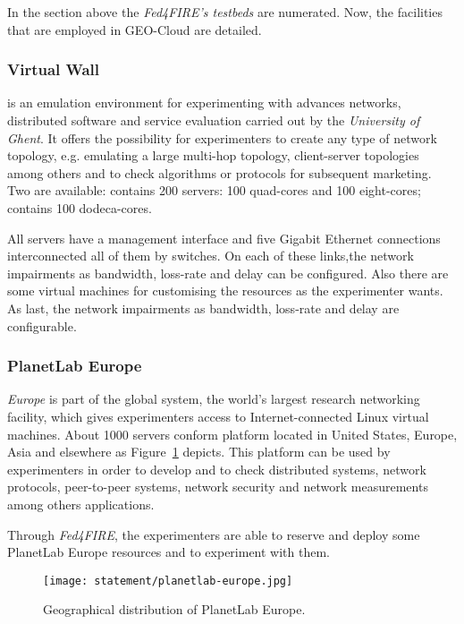 In the section above the \emph{Fed4FIRE's testbeds} are numerated. Now, the
facilities that are employed in GEO-Cloud are detailed.

\subsubsection{Virtual Wall}

\vw is an emulation environment for
experimenting with advances networks, distributed software and service
evaluation carried out by the \emph{University of Ghent}. It offers the possibility for experimenters to create any type of
network topology, e.g. emulating a large multi-hop topology, client-server
topologies among others and to check algorithms or protocols for subsequent
marketing. 
Two \vw are available:  contains 200 servers: 100
quad-cores and 100 eight-cores;  contains 100 dodeca-cores. 

All servers have a management interface and five Gigabit Ethernet connections
interconnected all of them by switches. On each of these links,the network
impairments as bandwidth, loss-rate and delay can be configured. Also there are some virtual machines for
customising the resources as the experimenter wants. As last, the network
impairments as bandwidth, loss-rate and delay are configurable.  

\subsubsection{PlanetLab Europe}

\pl \emph{Europe} is part of the \pl global system, the world's largest
research networking facility, which gives experimenters access to
Internet-connected Linux virtual machines. About 1000 servers conform \pl
platform located in United States, Europe, Asia and elsewhere as Figure~\ref{fig:intr-planetlab-europe} depicts. 
This platform can be used by experimenters in order to develop and to check
distributed systems, network protocols, peer-to-peer systems, network security
and network measurements among others applications.

Through \emph{Fed4FIRE}, the experimenters are able to reserve and deploy some
PlanetLab Europe resources and to experiment with them.

\begin{figure}[!h]
\begin{center}
\texttt{[image: statement/planetlab-europe.jpg]}
\caption{Geographical distribution of PlanetLab Europe.}
\label{fig:intr-planetlab-europe}
\end{center}
\end{figure}

